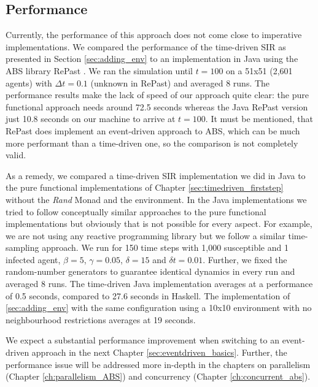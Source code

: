 \subsection{Performance}
Currently, the performance of this approach does not come close to imperative implementations. We compared the performance of the time-driven SIR as presented in Section \ref{sec:adding_env} to an implementation in Java using the ABS library RePast \cite{north_complex_2013}. We ran the simulation until $t = 100$ on a 51x51 (2,601 agents) with $\Delta t = 0.1$ (unknown in RePast) and averaged 8 runs. The performance results make the lack of speed of our approach quite clear: the pure functional approach needs around 72.5 seconds whereas the Java RePast version just 10.8 seconds on our machine to arrive at $t = 100$. It must be mentioned, that RePast does implement an event-driven approach to ABS, which can be much more performant \cite{meyer_event-driven_2014} than a time-driven one, so the comparison is not completely valid.

As a remedy, we compared a time-driven SIR implementation we did in Java to the pure functional implementations of Chapter \ref{sec:timedriven_firststep} without the \textit{Rand} Monad and the environment. In the Java implementations we tried to follow conceptually similar approaches to the pure functional implementations but obviously that is not possible for every aspect. For example, we are not using any reactive programming library but we follow a similar time-sampling approach. We run for 150 time steps with 1,000 susceptible and 1 infected agent, $\beta = 5$, $\gamma = 0.05$, $\delta = 15$ and $\delta t = 0.01$. Further, we fixed the random-number generators to guarantee identical dynamics in every run and averaged 8 runs. The time-driven Java implementation averages at a performance of 0.5 seconds, compared to 27.6 seconds in Haskell. The implementation of \ref{sec:adding_env} with the same configuration using a 10x10 environment with no neighbourhood restrictions averages at 19 seconds.

We expect a substantial performance improvement when switching to an event-driven approach \cite{meyer_event-driven_2014} in the next Chapter \ref{sec:eventdriven_basics}. Further, the performance issue will be addressed more in-depth in the chapters on parallelism (Chapter \ref{ch:parallelism_ABS}) and concurrency (Chapter \ref{ch:concurrent_abs}).